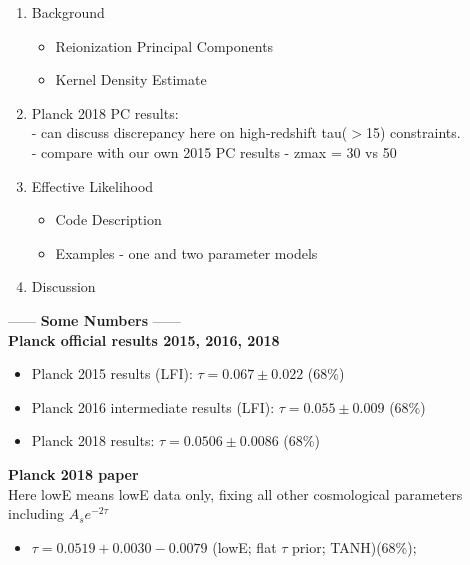 \documentclass[prd,twocolumn,amsmath,amssymb,floatfix,superscriptaddress,nofootinbib]{revtex4-1}
\begin{document}
{\begin{enumerate}
	\item{Background}
		\begin{itemize}
			\item{Reionization Principal Components}	
			\item{Kernel Density Estimate}
		\end{itemize}
	\item{Planck 2018 PC results:\\
		- can discuss discrepancy here on high-redshift tau($>$15) constraints.\\
		- compare with our own 2015 PC results
		- zmax = 30 vs 50}
	\item{Effective Likelihood}
		\begin{itemize}
			\item{Code Description}
			\item{Examples - one and two parameter models}
		\end{itemize}
	\item{Discussion}
		
\end{enumerate}

------ \textbf{Some Numbers} ------ \\

\textbf{Planck official results 2015, 2016, 2018} \\

\begin{itemize}
    
    \item Planck 2015 results (LFI): $\tau = 0.067 \pm 0.022$ (68\%) \\

    \item Planck 2016  intermediate results (LFI): $\tau = 0.055 \pm 0.009$ (68\%) \\
    
    \item Planck 2018 results: $\tau = 0.0506 \pm 0.0086$ (68\%) \\

\end{itemize}

\textbf{Planck 2018 paper} \\

Here lowE means lowE data only, fixing all other cosmological parameters including $A_s e^{-2\tau}$\\

\begin{itemize}

\item $\tau = 0.0519+0.0030-0.0079$ (lowE; flat $\tau$ prior; TANH)(68\%); \\


\end{itemize}}
\end{document}
